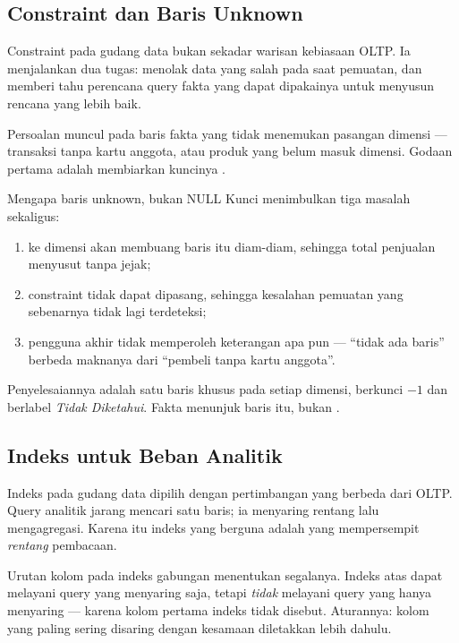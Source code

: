 \subsection{Constraint dan Baris Unknown}

Constraint pada gudang data bukan sekadar warisan kebiasaan OLTP. Ia
menjalankan dua tugas: menolak data yang salah pada saat pemuatan, dan memberi
tahu perencana query fakta yang dapat dipakainya untuk menyusun rencana yang
lebih baik.

Persoalan muncul pada baris fakta yang tidak menemukan pasangan dimensi ---
transaksi tanpa kartu anggota, atau produk yang belum masuk dimensi. Godaan
pertama adalah membiarkan kuncinya .

\begin{konsep}{Mengapa baris unknown, bukan NULL}
Kunci  menimbulkan tiga masalah sekaligus:
\begin{enumerate}[leftmargin=1.4em]
  \item {} ke dimensi akan membuang baris itu diam-diam,
        sehingga total penjualan menyusut tanpa jejak;
  \item constraint  tidak dapat dipasang, sehingga kesalahan
        pemuatan yang sebenarnya tidak lagi terdeteksi;
  \item pengguna akhir tidak memperoleh keterangan apa pun --- ``tidak ada
        baris'' berbeda maknanya dari ``pembeli tanpa kartu anggota''.
\end{enumerate}
Penyelesaiannya adalah satu baris khusus pada setiap dimensi, berkunci
$-1$ dan berlabel \emph{Tidak Diketahui}. Fakta menunjuk baris itu, bukan
.
\end{konsep}

\subsection{Indeks untuk Beban Analitik}

Indeks pada gudang data dipilih dengan pertimbangan yang berbeda dari OLTP.
Query analitik jarang mencari satu baris; ia menyaring rentang lalu
mengagregasi. Karena itu indeks yang berguna adalah yang mempersempit
\emph{rentang} pembacaan.

Urutan kolom pada indeks gabungan menentukan segalanya. Indeks atas
 dapat melayani query yang menyaring
 saja, tetapi \emph{tidak} melayani query yang hanya
menyaring  --- karena kolom pertama indeks tidak
disebut. Aturannya: kolom yang paling sering disaring dengan kesamaan
diletakkan lebih dahulu.

